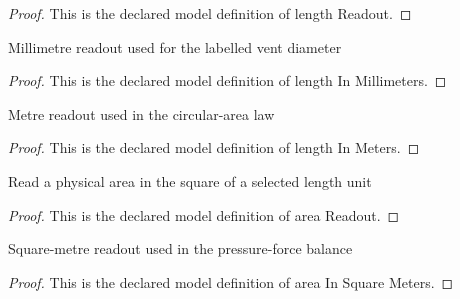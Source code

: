 \begin{proof}
  This is the declared model definition of length Readout.
\end{proof}
\begin{definition}
  \label{def:physics:phyx-mini-0484:phyxminiproblems-problemphyxmini0484-lengthinmillimeters}
  Millimetre readout used for the labelled vent diameter
\end{definition}
\begin{proof}
  This is the declared model definition of length In Millimeters.
\end{proof}
\begin{definition}
  \label{def:physics:phyx-mini-0484:phyxminiproblems-problemphyxmini0484-lengthinmeters}
  Metre readout used in the circular-area law
\end{definition}
\begin{proof}
  This is the declared model definition of length In Meters.
\end{proof}
\begin{definition}
  \label{def:physics:phyx-mini-0484:phyxminiproblems-problemphyxmini0484-areareadout}
  Read a physical area in the square of a selected length unit
\end{definition}
\begin{proof}
  This is the declared model definition of area Readout.
\end{proof}
\begin{definition}
  \label{def:physics:phyx-mini-0484:phyxminiproblems-problemphyxmini0484-areainsquaremeters}
  Square-metre readout used in the pressure-force balance
\end{definition}
\begin{proof}
  This is the declared model definition of area In Square Meters.
\end{proof}
